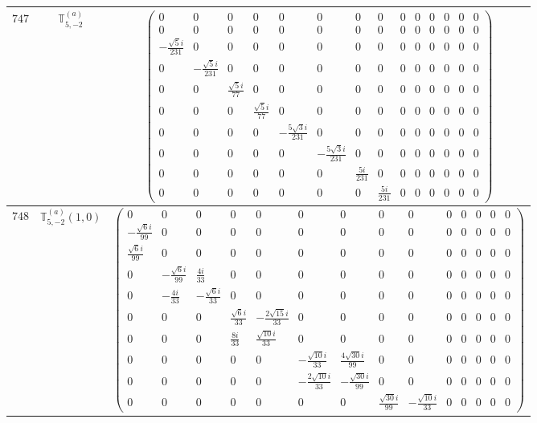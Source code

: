 \documentclass[fleqn,8pt,landscape]{jsarticle}
\begin{document}
\begin{center}
\begin{longtable}{ccc}
$ 747 $ & $ \mathbb{T}_{5,-2}^{(a)} $ & $ \begin{pmatrix} 0 & 0 & 0 & 0 & 0 & 0 & 0 & 0 & 0 & 0 & 0 & 0 & 0 & 0 \\ 0 & 0 & 0 & 0 & 0 & 0 & 0 & 0 & 0 & 0 & 0 & 0 & 0 & 0 \\ - \frac{\sqrt{5} i}{231} & 0 & 0 & 0 & 0 & 0 & 0 & 0 & 0 & 0 & 0 & 0 & 0 & 0 \\ 0 & - \frac{\sqrt{5} i}{231} & 0 & 0 & 0 & 0 & 0 & 0 & 0 & 0 & 0 & 0 & 0 & 0 \\ 0 & 0 & \frac{\sqrt{5} i}{77} & 0 & 0 & 0 & 0 & 0 & 0 & 0 & 0 & 0 & 0 & 0 \\ 0 & 0 & 0 & \frac{\sqrt{5} i}{77} & 0 & 0 & 0 & 0 & 0 & 0 & 0 & 0 & 0 & 0 \\ 0 & 0 & 0 & 0 & - \frac{5 \sqrt{3} i}{231} & 0 & 0 & 0 & 0 & 0 & 0 & 0 & 0 & 0 \\ 0 & 0 & 0 & 0 & 0 & - \frac{5 \sqrt{3} i}{231} & 0 & 0 & 0 & 0 & 0 & 0 & 0 & 0 \\ 0 & 0 & 0 & 0 & 0 & 0 & \frac{5 i}{231} & 0 & 0 & 0 & 0 & 0 & 0 & 0 \\ 0 & 0 & 0 & 0 & 0 & 0 & 0 & \frac{5 i}{231} & 0 & 0 & 0 & 0 & 0 & 0 \end{pmatrix} $ \\ \hline
$ 748 $ & $ \mathbb{T}_{5,-2}^{(a)}(1,0) $ & $ \begin{pmatrix} 0 & 0 & 0 & 0 & 0 & 0 & 0 & 0 & 0 & 0 & 0 & 0 & 0 & 0 \\ - \frac{\sqrt{6} i}{99} & 0 & 0 & 0 & 0 & 0 & 0 & 0 & 0 & 0 & 0 & 0 & 0 & 0 \\ \frac{\sqrt{6} i}{99} & 0 & 0 & 0 & 0 & 0 & 0 & 0 & 0 & 0 & 0 & 0 & 0 & 0 \\ 0 & - \frac{\sqrt{6} i}{99} & \frac{4 i}{33} & 0 & 0 & 0 & 0 & 0 & 0 & 0 & 0 & 0 & 0 & 0 \\ 0 & - \frac{4 i}{33} & - \frac{\sqrt{6} i}{33} & 0 & 0 & 0 & 0 & 0 & 0 & 0 & 0 & 0 & 0 & 0 \\ 0 & 0 & 0 & \frac{\sqrt{6} i}{33} & - \frac{2 \sqrt{15} i}{33} & 0 & 0 & 0 & 0 & 0 & 0 & 0 & 0 & 0 \\ 0 & 0 & 0 & \frac{8 i}{33} & \frac{\sqrt{10} i}{33} & 0 & 0 & 0 & 0 & 0 & 0 & 0 & 0 & 0 \\ 0 & 0 & 0 & 0 & 0 & - \frac{\sqrt{10} i}{33} & \frac{4 \sqrt{30} i}{99} & 0 & 0 & 0 & 0 & 0 & 0 & 0 \\ 0 & 0 & 0 & 0 & 0 & - \frac{2 \sqrt{10} i}{33} & - \frac{\sqrt{30} i}{99} & 0 & 0 & 0 & 0 & 0 & 0 & 0 \\ 0 & 0 & 0 & 0 & 0 & 0 & 0 & \frac{\sqrt{30} i}{99} & - \frac{\sqrt{10} i}{33} & 0 & 0 & 0 & 0 & 0 \end{pmatrix} $ \\ \hline

\end{longtable}
\end{center}
\end{document}
